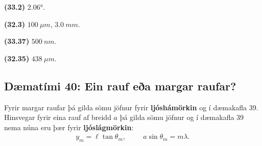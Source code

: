 \begin{tcolorbox}
\begin{enumerate*}[label = ]
  \item \textbf{(33.2)} $\ang{2.06}$.
  \item \textbf{(32.3)} $\SI{100}{\mu m}$, $\SI{3.0}{mm}$.
  \item \textbf{(33.37)} $\SI{500}{nm}$.
  \item \textbf{(32.35)} $\SI{438}{\mu m}$.
\end{enumerate*}
\end{tcolorbox}

\newpage

\subsection*{Dæmatími 40: Ein rauf eða margar raufar?}

\begin{tcolorbox}
Fyrir margar raufar þá gilda sömu jöfnur fyrir \textbf{ljóshámörkin} og í dæmakafla 39. Hinsvegar fyrir eina rauf af breidd $a$ þá gilda sömu jöfnur og í dæmakafla 39 nema núna eru þær fyrir \textbf{ljóslágmörkin}:
\begin{align*}
    y_m = \ell \tan\theta_m, \hspace{1cm} a\sin\theta_m = m \lambda.
\end{align*}
\end{tcolorbox}

